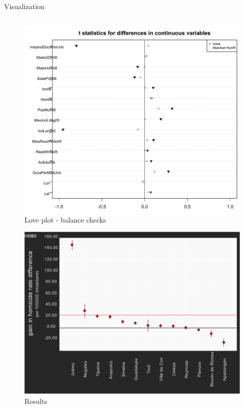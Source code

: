 \documentclass[final]{beamer}
\newlength{\onecolwid}
\newlength{\twocolwid}
\begin{document}
\begin{frame}[t]
\begin{columns}[t]
\begin{column}{\twocolwid}
\begin{block}{ Visualization}
        \begin{columns}[t,totalwidth=\twocolwid]
          \begin{column}{\onecolwid}
            \begin{figure}[htdp]
              \includegraphics[scale=1]{../Images/FinalLoveplot.pdf}
              \caption*{Love plot - balance checks}
            \end{figure}

             \begin{figure}[htdp]
               \includegraphics[scale=1.1]{../Images/results.png}
              \caption*{Results}
            \end{figure}
          \end{column}


\end{columns}
\end{block}
\end{column}
\end{columns}
\end{frame}
\end{document}
